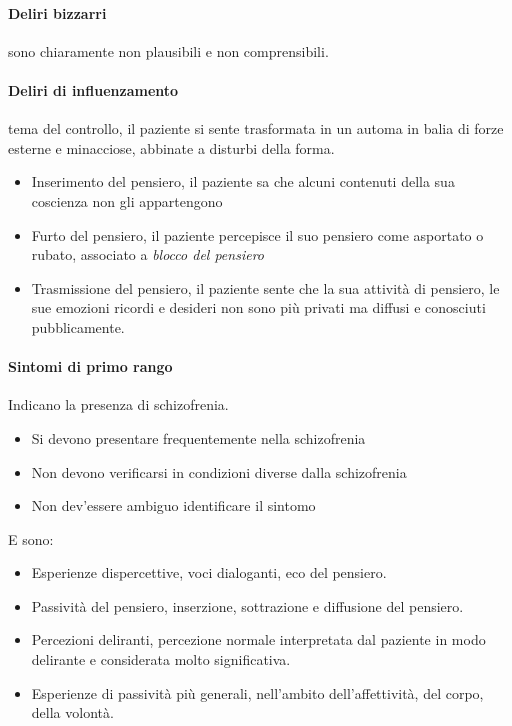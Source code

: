 {\paragraph{Deliri bizzarri}  sono chiaramente non plausibili e non comprensibili.

\paragraph{Deliri di influenzamento}  tema del controllo, il paziente si sente trasformata in un automa in balia di forze esterne e minacciose, abbinate a disturbi della forma.
\begin{itemize}
	\item Inserimento del pensiero, il paziente sa che alcuni contenuti della sua coscienza non gli appartengono
\item Furto del pensiero, il paziente percepisce il suo pensiero come asportato o rubato, associato a \emph{blocco del pensiero}
	\item Trasmissione del pensiero, il paziente sente che la sua attività di pensiero, le sue emozioni ricordi e desideri non sono più privati ma diffusi e conosciuti pubblicamente.
\end{itemize}

\paragraph{Sintomi di primo rango} Indicano la presenza di schizofrenia. 
\begin{itemize}
	\item Si devono presentare frequentemente nella schizofrenia
	\item Non devono verificarsi in condizioni diverse dalla schizofrenia
	\item Non dev'essere ambiguo identificare il sintomo
\end{itemize}
E sono:
\begin{itemize}
	\item Esperienze dispercettive, voci dialoganti, eco del pensiero.
	\item Passività del pensiero, inserzione, sottrazione e diffusione del pensiero.
	\item Percezioni deliranti, percezione normale interpretata dal paziente in modo delirante e considerata molto significativa.
	\item Esperienze di passività più generali, nell'ambito dell'affettività, del corpo, della volontà.
\end{itemize}

}
